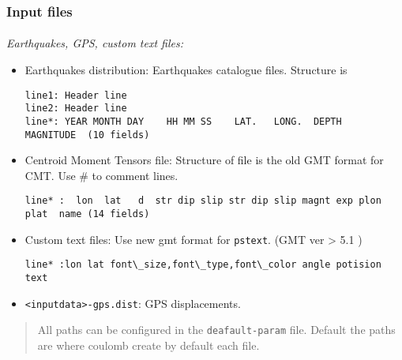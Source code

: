 \begin{frame}[t,fragile]
  \frametitle{Input files}
  \framesubtitle{}
  \label{fr2:satgeod3}
\emph{Earthquakes, GPS, custom text files:}

\begin{itemize}
\item
  Earthquakes distribution: Earthquakes catalogue files. Structure is

\begin{verbatim}
line1: Header line
line2: Header line
line*: YEAR MONTH DAY    HH MM SS    LAT.   LONG.  DEPTH    MAGNITUDE  (10 fields)
\end{verbatim}
\item
  Centroid Moment Tensors file: Structure of file is the old GMT format
  for CMT. Use \# to comment lines.

\begin{verbatim}
line* :  lon  lat   d  str dip slip str dip slip magnt exp plon  plat  name (14 fields)
\end{verbatim}
\item
  Custom text files: Use new gmt format for \texttt{pstext}. (GMT ver
  \textgreater{} 5.1 )

\begin{verbatim}
line* :lon lat font\_size,font\_type,font\_color angle potision text
\end{verbatim}
\item
  \texttt{\textless{}inputdata\textgreater{}-gps.dist}: GPS
  displacements.
\end{itemize}

\begin{quote}
All paths can be configured in the \texttt{deafault-param} file. Default
the paths are where coulomb create by default each file.
\end{quote}

\end{frame}
\note{} %














